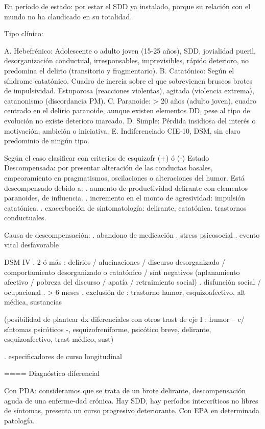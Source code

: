 \documentclass[encares.tex]{subfiles}
\begin{document}
En período de estado: por estar el SDD ya instalado, porque su relación con el mundo no ha claudicado en su totalidad. 

Tipo clínico: 

A. Hebefrénico: Adolescente o adulto joven (15-25 años), SDD, jovialidad pueril, desorganización conductual, irresponsables, imprevisibles, rápido deterioro, no predomina el delirio (transitorio y fragmentario). 
B. Catatónico: Según el síndrome catatónico. Cuadro de inercia sobre el que sobrevienen bruscos brotes de impulsividad. Estuporosa (reacciones violentas), agitada (violencia extrema), catanonismo (discordancia PM). 
C. Paranoide: > 20 años (adulto joven), cuadro centrado en el delirio paranoide, aunque existen elementos DD, pese al tipo de evolución no existe deterioro marcado. 
D. Simple: Pérdida insidiosa del interés o motivación, ambición o iniciativa. 
E. Indiferenciado CIE-10, DSM, sin claro predominio de ningún tipo.

Según el caso clasificar con criterios de esquizofr (+) ó (-) Estado Descompensada: por presentar alteración de las conductas basales, empeoramiento en pragmatismos, oscilaciones o alteraciones del humor. Está descompensado debido a: . aumento de productividad delirante con elementos paranoides, de influencia. . incremento en el monto de agresividad: impulsión catatónica. . exacerbación de sintomatología: delirante, catatónica. trastornos conductuales.

Causa de descompensación: 
. abandono de medicación
. stress psicosocial
. evento vital desfavorable 

DSM IV
. 2 ó más : delirios / alucinaciones / discurso desorganizado / comportamiento desorganizado o catatónico / sínt negativos (aplanamiento afectivo / pobreza del discurso / apatía / retraimiento social)
. disfunción social / ocupacional
. > 6 meses
. exclusión de : trastorno humor, esquizoafectivo, alt médica, sustancias

(posibilidad de plantear dx diferenciales con otros trast de eje I : humor – c/ síntomas psicóticos -, esquizofreniforme, psicótico breve, delirante, esquizoafectivo, trast médico, sust)

. especificadores de curso longitudinal

==== Diagnóstico diferencial

Con PDA: consideramos que se trata de un brote delirante, descompensación aguda de una enferme-dad crónica. Hay SDD, hay períodos intercríticos no libres de síntomas, presenta un curso progresivo deteriorante. Con EPA en determinada patología.
\end{document}
